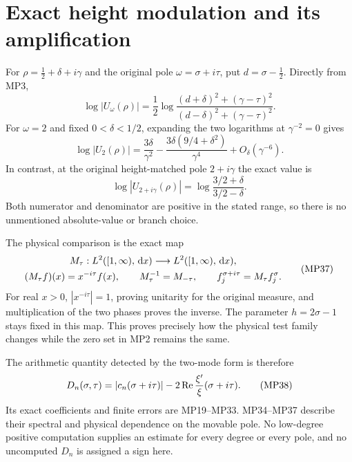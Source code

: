 \documentclass[11pt]{article}
\begin{document}
\section{Exact height modulation and its amplification}
For $\rho=\tfrac12+\delta+i\gamma$ and the original pole
$\omega=\sigma+i\tau$, put $d=\sigma-\tfrac12$. Directly from MP3,
\begin{equation}
 \log|U_\omega(\rho)|
 =\frac12\log\frac{(d+\delta)^2+(\gamma-\tau)^2}
                         {(d-\delta)^2+(\gamma-\tau)^2}.
 \tag{MP34}
\end{equation}
For $\omega=2$ and fixed $0<\delta<1/2$, expanding the two logarithms
at $\gamma^{-2}=0$ gives
\begin{equation}
 \log|U_2(\rho)|
 =\frac{3\delta}{\gamma^2}
   -\frac{3\delta(9/4+\delta^2)}{\gamma^4}
   +O_\delta(\gamma^{-6}).\tag{MP35}
\end{equation}
In contrast, at the original height-matched pole $2+i\gamma$ the exact
value is
\begin{equation}
 \log|U_{2+i\gamma}(\rho)|
       =\log\frac{3/2+\delta}{3/2-\delta}.
 \tag{MP36}
\end{equation}
Both numerator and denominator are positive in the stated range, so
there is no unmentioned absolute-value or branch choice.

The physical comparison is the exact map
\begin{equation}
 \begin{gathered}
 M_\tau:L^2([1,\infty),\,\mathrm d x)\longrightarrow L^2([1,\infty),\,\mathrm d x),
 \\ (M_\tau f)(x)=x^{-i\tau}f(x),
 \qquad M_\tau^{-1}=M_{-\tau},\qquad
 f_j^{\sigma+i\tau}=M_\tau f_j^\sigma.
 \end{gathered}
 \tag{MP37}
\end{equation}
For real $x>0$, $|x^{-i\tau}|=1$, proving unitarity for the original
measure, and multiplication of the two phases proves the inverse.
The parameter $h=2\sigma-1$ stays fixed in this map. This proves precisely
how the physical test family changes while the zero set in MP2 remains
the same.

The arithmetic quantity detected by the two-mode form is therefore
\begin{equation}
 D_n(\sigma,\tau)=|c_n(\sigma+i\tau)|-
            2\operatorname{Re}\frac{\xi'}{\xi}(\sigma+i\tau).
 \tag{MP38}
\end{equation}
Its exact coefficients and finite errors are MP19--MP33. MP34--MP37
describe their spectral and physical dependence on the movable pole.
No low-degree positive computation supplies an estimate for every
degree or every pole, and no uncomputed $D_n$ is assigned a sign here.
\end{document}
